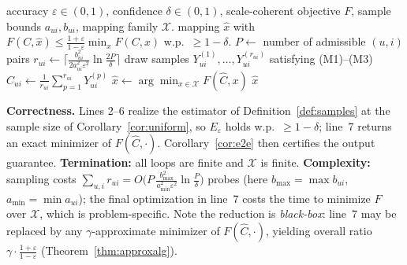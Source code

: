 \documentclass{amsart}
\theoremstyle{definition}
\newcommand{\Chat}{\widehat{C}}
\begin{document}
\begin{algorithm}[h]
\caption{EstimatedOptimalMapping}\label{alg:map}
\begin{algorithmic}[1]
\Require accuracy $\varepsilon\in(0,1)$, confidence $\delta\in(0,1)$, scale-coherent objective $F$, sample bounds $a_{ui},b_{ui}$, mapping family $\mathcal X$.
\Ensure mapping $\hat x$ with $F(C,\hat x)\le \frac{1+\varepsilon}{1-\varepsilon}\min_{x}F(C,x)$ w.p.\ $\ge 1-\delta$.
\State $P\gets$ number of admissible $(u,i)$ pairs
  \State $r_{ui}\gets \big\lceil \frac{b_{ui}^2}{2a_{ui}^2\varepsilon^2}\ln\frac{2P}{\delta}\big\rceil$
  \State draw samples $Y^{(1)}_{ui},\dots,Y^{(r_{ui})}_{ui}$ satisfying (M1)--(M3)
  \State $\Chat_{ui}\gets \frac{1}{r_{ui}}\sum_{p=1}^{r_{ui}} Y^{(p)}_{ui}$
\EndFor
\State $\hat x \gets \arg\min_{x\in\mathcal X} F(\Chat,x)$
\State \Return $\hat x$
\end{algorithmic}
\end{algorithm}

\noindent\textbf{Correctness.} Lines 2--6 realize the estimator of
Definition~\ref{def:samples} at the sample size of
Corollary~\ref{cor:uniform}, so $E_\varepsilon$ holds w.p.\ $\ge1-\delta$; line~7
returns an exact minimizer of $F(\Chat,\cdot)$. Corollary~\ref{cor:e2e} then
certifies the output guarantee. \textbf{Termination:} all loops are finite and
$\mathcal X$ is finite. \textbf{Complexity:} sampling costs
$\sum_{u,i} r_{ui} = O\!\big(P\,\frac{b_{\max}^2}{a_{\min}^2\varepsilon^2}\ln\frac{P}{\delta}\big)$
probes (here $b_{\max}=\max b_{ui}$, $a_{\min}=\min a_{ui}$); the final
optimization in line~7 costs the time to minimize $F$ over $\mathcal X$, which is
problem-specific. Note the reduction is \emph{black-box}: line~7 may be replaced
by any $\gamma$-approximate minimizer of $F(\Chat,\cdot)$, yielding overall ratio
$\gamma\cdot\frac{1+\varepsilon}{1-\varepsilon}$ (Theorem~\ref{thm:approxalg}).
\end{document}
